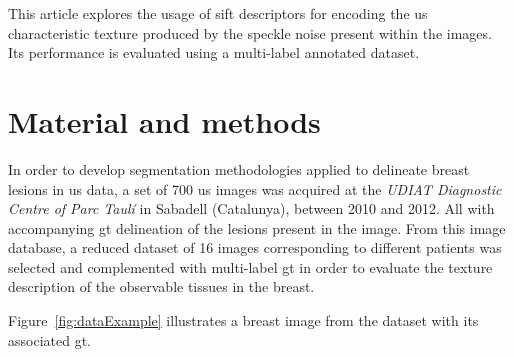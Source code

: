\documentclass[a4paper, 10pt, conference]{llncs}      %
\begin{document}

This article explores the usage of \ac{sift} descriptors for encoding the \ac{us} characteristic texture produced by the speckle noise present within the images. Its performance is evaluated using a multi-label annotated dataset.  

\section{Material and methods}
In order to develop segmentation methodologies applied to delineate breast lesions in \ac{us} data, a set of 700 \ac{us} images was acquired at the \emph{UDIAT Diagnostic Centre of Parc Taul\'{i}} in Sabadell (Catalunya), between 2010 and 2012. All with accompanying \ac{gt} delineation of the lesions present in the image. From this image database, a reduced dataset of 16 images corresponding to different patients was selected and complemented with multi-label \ac{gt} in order to evaluate the texture description of the observable tissues in the breast.

Figure~\ref{fig:dataExample} illustrates a breast image from the dataset with its associated \ac{gt}. 


\end{document}
